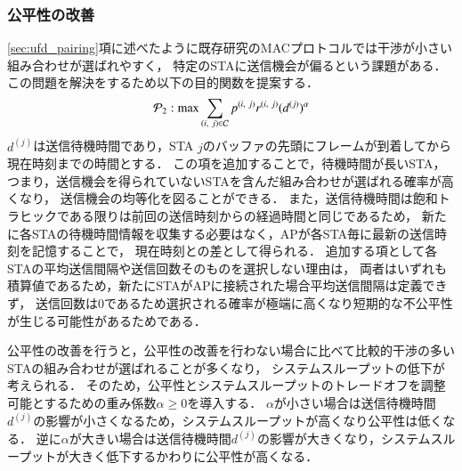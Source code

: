 \documentclass[master]{kuisthesis}		%
\begin{document}
		\subsubsection{公平性の改善}\label{sec:fair}
			\ref{sec:ufd_pairing}項に述べたように既存研究のMACプロトコルでは干渉が小さい組み合わせが選ばれやすく，
			特定のSTAに送信機会が偏るという課題がある．
			この問題を解決をするため以下の目的関数を提案する．
			\begin{equation}
				{\mathcal P}_2: {\rm max} \sum_{(i,\ j)\in{\mathcal C}} p^{(i,\ j)}r^{(i,\ j)}(d^{(j)})^{\alpha} 	\label{eq:p2}
			\end{equation}
			$d^{(j)}$は送信待機時間であり，STA $j$のバッファの先頭にフレームが到着してから現在時刻までの時間とする．
			この項を追加することで，待機時間が長いSTA，つまり，送信機会を得られていないSTAを含んだ組み合わせが選ばれる確率が高くなり，
			送信機会の均等化を図ることができる．
			また，送信待機時間は飽和トラヒックである限りは前回の送信時刻からの経過時間と同じであるため，
			新たに各STAの待機時間情報を収集する必要はなく，APが各STA毎に最新の送信時刻を記憶することで，
			現在時刻との差として得られる．
			追加する項として各STAの平均送信間隔や送信回数そのものを選択しない理由は，
			両者はいずれも積算値であるため，新たにSTAがAPに接続された場合平均送信間隔は定義できず，
			送信回数は0であるため選択される確率が極端に高くなり短期的な不公平性が生じる可能性があるためである．
			\par
			公平性の改善を行うと，公平性の改善を行わない場合に比べて比較的干渉の多いSTAの組み合わせが選ばれることが多くなり，
			システムスループットの低下が考えられる．
			そのため，公平性とシステムスループットのトレードオフを調整可能とするための重み係数$\alpha\geq 0$を導入する．
			$\alpha$が小さい場合は送信待機時間$d^{(j)}$の影響が小さくなるため，システムスループットが高くなり公平性は低くなる．
			逆に$\alpha$が大きい場合は送信待機時間$d^{(j)}$の影響が大きくなり，システムスループットが大きく低下するかわりに公平性が高くなる．
\end{document}
